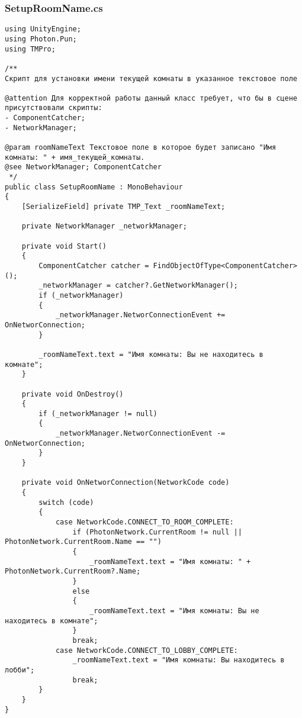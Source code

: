\subsubsection*{SetupRoomName.cs}
\begin{verbatim}
﻿using UnityEngine;
using Photon.Pun;
using TMPro;

/**
Скрипт для установки имени текущей комнаты в указанное текстовое поле

@attention Для корректной работы данный класс требует, что бы в сцене присутствовали скрипты:
- ComponentCatcher;
- NetworkManager;

@param roomNameText Текстовое поле в которое будет записано "Имя комнаты: " + имя_текущей_комнаты.
@see NetworkManager; ComponentCatcher
 */
public class SetupRoomName : MonoBehaviour
{
    [SerializeField] private TMP_Text _roomNameText;

    private NetworkManager _networkManager;

    private void Start()
    {
        ComponentCatcher catcher = FindObjectOfType<ComponentCatcher>();
        _networkManager = catcher?.GetNetworkManager();
        if (_networkManager)
        {
            _networkManager.NetworConnectionEvent += OnNetworConnection;
        }

        _roomNameText.text = "Имя комнаты: Вы не находитесь в комнате";
    }

    private void OnDestroy()
    {
        if (_networkManager != null)
        {
            _networkManager.NetworConnectionEvent -= OnNetworConnection;
        }
    }

    private void OnNetworConnection(NetworkCode code)
    {
        switch (code)
        {
            case NetworkCode.CONNECT_TO_ROOM_COMPLETE:
                if (PhotonNetwork.CurrentRoom != null || PhotonNetwork.CurrentRoom.Name == "")
                {
                    _roomNameText.text = "Имя комнаты: " + PhotonNetwork.CurrentRoom?.Name;
                }
                else
                {
                    _roomNameText.text = "Имя комнаты: Вы не находитесь в комнате";
                }
                break;
            case NetworkCode.CONNECT_TO_LOBBY_COMPLETE:
                _roomNameText.text = "Имя комнаты: Вы находитесь в лобби";
                break;
        }
    }
}

\end{verbatim}
